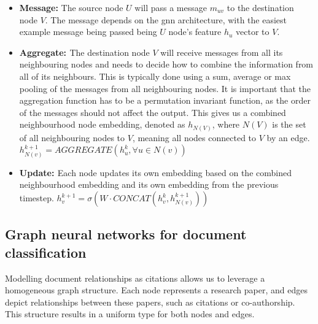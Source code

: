 \documentclass[10pt,oneside]{book}
\begin{document}
\begin{tcolorbox}[title=Message Passing Neural Networks in \gls*{gnn}s]
    \begin{itemize}
        \item {\bf{Message:}} The source node $U$ will pass a message $m_{uv}$ to the destination node $V$. The message depends on the \gls*{gnn} architecture, with the easiest example message being passed being $U$ node's feature $h_u$ vector to $V$.
        \item {\bf{Aggregate: }} The destination node $V$ will receive messages from all its neighbouring nodes and needs to decide how to combine the information from all of its neighbours. This is typically done using a sum, average or max pooling of the messages from all neighbouring nodes. It is important that the aggregation function has to be a permutation invariant function, as the order of the messages should not affect the output. This gives us a combined neighbourhood node embedding, denoted as $h_{N(V)}$, where $N(V)$ is the set of all neighbouring nodes to $V$, meaning all nodes connected to $V$ by an edge. $h_{N(v)}^{k+1} = AGGREGATE({h_u^k, \forall u \in N(v)})$
        \item {\bf{Update: }} Each node updates its own embedding based on the combined neighbourhood embedding and its own embedding from the previous timestep. $h_v^{k+1} = \sigma(W \cdot CONCAT(h_v^k, h_{N(v)}^{k+1}))$
    \end{itemize}

\end{tcolorbox}

\subsection{Graph neural networks for document classification}

Modelling document relationships as citations allows us to leverage a homogeneous graph structure. Each node represents a research paper, and edges depict relationships between these papers, such as citations or co-authorship. This structure results in a uniform type for both nodes and edges.
\end{document}
